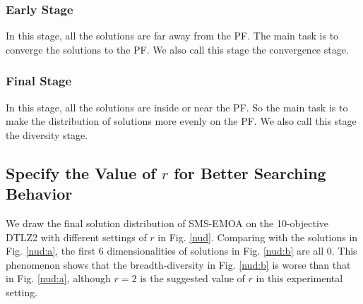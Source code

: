 \documentclass[conference]{IEEEtran}
\begin{document}
\subsubsection{Early Stage} In this stage, 
all the solutions are far away from the PF.
The main task is to converge the solutions to the PF.
We also call this stage the convergence stage.
\subsubsection{Final Stage} In this stage,
all the solutions are inside or near the PF. 
So the main task is to make the distribution of solutions more evenly on the PF.
We also call this stage the diversity stage.

%
% 
\subsection{Specify the Value of $r$ for Better Searching Behavior}
We draw the final solution distribution of SMS-EMOA on the 10-objective DTLZ2 with different settings of $r$ in Fig. \ref{nud}. 
Comparing with the solutions in Fig. \ref{nud:a}, 
the first 6 dimensionalities of solutions in Fig. \ref{nud:b} are all 0.
This phenomenon shows that the breadth-diversity\cite{DtA} in Fig. \ref{nud:b} is worse than that in Fig. \ref{nud:a},
although $r=2$ is the suggested value of $r$ in this experimental setting. 
\end{document}
